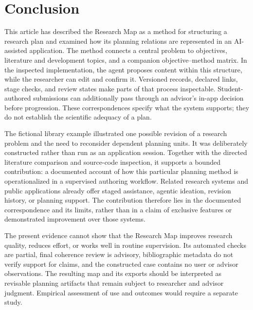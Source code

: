 \section{Conclusion}
\label{sec:conclusion}

This article has described the Research Map as a method for structuring a research plan and examined how its planning relations are represented in an AI-assisted application. The method connects a central problem to objectives, literature and development topics, and a companion objective--method matrix. In the inspected implementation, the agent proposes content within this structure, while the researcher can edit and confirm it. Versioned records, declared links, stage checks, and review states make parts of that process inspectable. Student-authored submissions can additionally pass through an advisor's in-app decision before progression. These correspondences specify what the system supports; they do not establish the scientific adequacy of a plan.

The fictional library example illustrated one possible revision of a research problem and the need to reconsider dependent planning units. It was deliberately constructed rather than run as an application session. Together with the directed literature comparison and source-code inspection, it supports a bounded contribution: a documented account of how this particular planning method is operationalized in a supervised authoring workflow. Related research systems and public applications already offer staged assistance, agentic ideation, revision history, or planning support. The contribution therefore lies in the documented correspondence and its limits, rather than in a claim of exclusive features or demonstrated improvement over those systems.

The present evidence cannot show that the Research Map improves research quality, reduces effort, or works well in routine supervision. Its automated checks are partial, final coherence review is advisory, bibliographic metadata do not verify support for claims, and the constructed case contains no user or advisor observations. The resulting map and its exports should be interpreted as revisable planning artifacts that remain subject to researcher and advisor judgment. Empirical assessment of use and outcomes would require a separate study.
